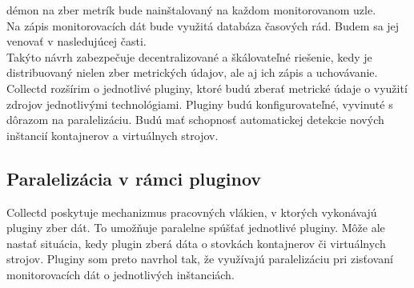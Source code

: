 \documentclass[12pt,twoside,color,cover,table]{fithesis3}
\begin{document}
démon na zber metrík bude nainštalovaný na každom monitorovanom uzle.
\\Na zápis monitorovacích dát bude využitá databáza časových rád. Budem sa jej venovať v nasledujúcej časti.
\\Takýto návrh zabezpečuje decentralizované a škálovateľné riešenie, kedy je distribuovaný nielen zber metrických údajov, ale aj ich zápis a uchovávanie.
\\Collectd rozšírim o jednotlivé pluginy, ktoré budú zberať metrické údaje o využití zdrojov jednotlivými technológiami. Pluginy budú 
konfigurovateľné, vyvinuté s dôrazom na paralelizáciu. Budú mať schopnosť automatickej detekcie nových inštancií kontajnerov a virtuálnych
strojov.

\subsection{Paralelizácia v rámci pluginov}
Collectd poskytuje mechanizmus pracovných vlákien, v ktorých vykonávajú pluginy zber dát. To umožňuje paralelne spúšťať jednotlivé pluginy.
Môže ale nastať situácia, kedy plugin zberá dáta o stovkách kontajnerov či virtuálnych strojov. Pluginy som preto navrhol tak, že využívajú
paralelizáciu pri zisťovaní monitorovacích dát o jednotlivých inštanciách. 
\end{document}
